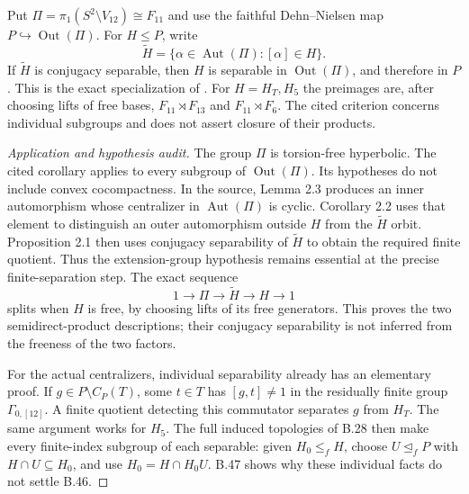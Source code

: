 Put $\Pi=\pi_1(S^2\setminus V_{12})\cong F_{11}$ and use
the faithful Dehn--Nielsen map $P\hookrightarrow\operatorname{Out}(\Pi)$.
For $H\leq P$, write
\[
 \widetilde H=\{\alpha\in\operatorname{Aut}(\Pi):
                        [\alpha]\in H\}.
\]
If $\widetilde H$ is conjugacy separable, then $H$ is separable
in $\operatorname{Out}(\Pi)$, and therefore in $P$.
This is the exact specialization of
\cite[Corollary D]{DE_FournierFacio2025}.
For $H=H_T,H_5$ the preimages are, after choosing lifts of
free bases, $F_{11}\rtimes F_{13}$ and $F_{11}\rtimes F_6$.
The cited criterion concerns individual subgroups and does
not assert closure of their products.
\begin{proof}[Application and hypothesis audit]
The group $\Pi$ is torsion-free hyperbolic.
The cited corollary applies to every subgroup of
$\operatorname{Out}(\Pi)$.
Its hypotheses do not include convex cocompactness.
In the source, Lemma 2.3 produces an inner automorphism whose
centralizer in $\operatorname{Aut}(\Pi)$ is cyclic.
Corollary 2.2 uses that element to distinguish an outer
automorphism outside $H$ from the $\widetilde H$ orbit.
Proposition 2.1 then uses conjugacy separability of
$\widetilde H$ to obtain the required finite quotient.
Thus the extension-group hypothesis remains essential at
the precise finite-separation step.  The exact sequence
\[
 1\longrightarrow\Pi\longrightarrow\widetilde H
       \longrightarrow H\longrightarrow1
\]
splits when $H$ is free, by choosing lifts of its free
generators.  This proves the two semidirect-product
descriptions; their conjugacy separability is not inferred
from the freeness of the two factors.

For the actual centralizers, individual separability already
has an elementary proof.  If $g\in P\setminus C_P(T)$,
some $t\in T$ has $[g,t]\ne1$ in the residually finite
group $\Gamma_{0,[12]}$.  A finite quotient detecting this
commutator separates $g$ from $H_T$.  The same argument
works for $H_5$.  The full induced topologies of B.28
then make every finite-index subgroup of each separable:
given $H_0\leq_f H$, choose $U\trianglelefteq_f P$
with $H\cap U\subseteq H_0$, and use
$H_0=H\cap H_0U$.  B.47 shows why these individual
facts do not settle B.46.


\end{proof}
